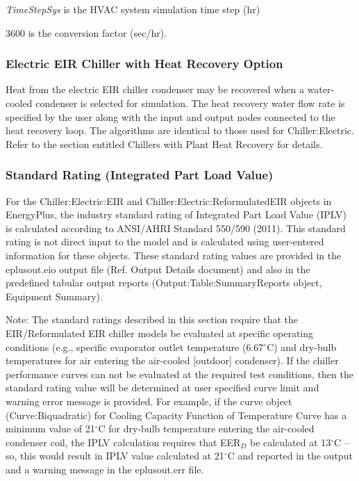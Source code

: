 \emph{TimeStepSys} is the HVAC system simulation time step (hr)

\(3600\) is the conversion factor (sec/hr).

\subsubsection{Electric EIR Chiller with Heat Recovery Option}\label{electric-eir-chiller-with-heat-recovery-option}

Heat from the electric EIR chiller condenser may be recovered when a water-cooled condenser is selected for simulation. The heat recovery water flow rate is specified by the user along with the input and output nodes connected to the heat recovery loop. The algorithms are identical to those used for Chiller:Electric. Refer to the section entitled Chillers with Plant Heat Recovery for details.

\subsubsection{Standard Rating (Integrated Part Load Value)}\label{standard-rating-integrated-part-load-value}

For the Chiller:Electric:EIR and Chiller:Electric:ReformulatedEIR objects in EnergyPlus, the industry standard rating of Integrated Part Load Value (IPLV) is calculated according to ANSI/AHRI Standard 550/590 (2011). This standard rating is not direct input to the model and is calculated using user-entered information for these objects. These standard rating values are provided in the eplusout.eio output file (Ref. Output Details document) and also in the predefined tabular output reports (Output:Table:SummaryReports object, Equipment Summary).

\begin{callout}
Note: The standard ratings described in this section require that the EIR/Reformulated EIR chiller models be evaluated at specific operating conditions (e.g., specific evaporator outlet temperature (6.67\(^{\circ}\)C) and dry-bulb temperatures for air entering the air-cooled {[}outdoor{]} condenser). If the chiller~ performance curves can not be evaluated at the required test conditions, then the standard rating value will be determined at user specified curve limit and warning error message is provided. For example, if the curve object (Curve:Biquadratic) for Cooling Capacity Function of Temperature Curve has a minimum value of 21\(^{\circ}\)C for dry-bulb temperature entering the air-cooled condenser coil, the IPLV calculation requires that EER\(_{D}\) be calculated at 13\(^{\circ}\)C -- so, this would result in IPLV value calculated at 21\(^{\circ}\)C and reported in the output and a warning message in the eplusout.err file.
\end{callout}

